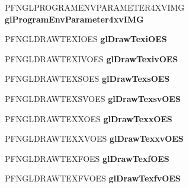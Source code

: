 \begin{DoxyCompactItemize}
\item 
\hypertarget{class_c_p_v_r_tgles_ext_a3f9936ef32dfaaa0a5e57d49b0a6a4ad}{P\+F\+N\+G\+L\+P\+R\+O\+G\+R\+A\+M\+E\+N\+V\+P\+A\+R\+A\+M\+E\+T\+E\+R4\+X\+V\+I\+M\+G {\bfseries gl\+Program\+Env\+Parameter4xv\+I\+M\+G}}\label{class_c_p_v_r_tgles_ext_a3f9936ef32dfaaa0a5e57d49b0a6a4ad}

\item 
\hypertarget{class_c_p_v_r_tgles_ext_a4cc9496b14a39f2ddc37dc9ef2ee9950}{P\+F\+N\+G\+L\+D\+R\+A\+W\+T\+E\+X\+I\+O\+E\+S {\bfseries gl\+Draw\+Texi\+O\+E\+S}}\label{class_c_p_v_r_tgles_ext_a4cc9496b14a39f2ddc37dc9ef2ee9950}

\item 
\hypertarget{class_c_p_v_r_tgles_ext_a1931e2f67771523267d8b02672d5a1fd}{P\+F\+N\+G\+L\+D\+R\+A\+W\+T\+E\+X\+I\+V\+O\+E\+S {\bfseries gl\+Draw\+Texiv\+O\+E\+S}}\label{class_c_p_v_r_tgles_ext_a1931e2f67771523267d8b02672d5a1fd}

\item 
\hypertarget{class_c_p_v_r_tgles_ext_ab3ec669c772512c975058543f5c95962}{P\+F\+N\+G\+L\+D\+R\+A\+W\+T\+E\+X\+S\+O\+E\+S {\bfseries gl\+Draw\+Texs\+O\+E\+S}}\label{class_c_p_v_r_tgles_ext_ab3ec669c772512c975058543f5c95962}

\item 
\hypertarget{class_c_p_v_r_tgles_ext_a024fc95335ec5854e8a09c81636b9ac1}{P\+F\+N\+G\+L\+D\+R\+A\+W\+T\+E\+X\+S\+V\+O\+E\+S {\bfseries gl\+Draw\+Texsv\+O\+E\+S}}\label{class_c_p_v_r_tgles_ext_a024fc95335ec5854e8a09c81636b9ac1}

\item 
\hypertarget{class_c_p_v_r_tgles_ext_aaf42aacaa35b157bed67e206942e1877}{P\+F\+N\+G\+L\+D\+R\+A\+W\+T\+E\+X\+X\+O\+E\+S {\bfseries gl\+Draw\+Texx\+O\+E\+S}}\label{class_c_p_v_r_tgles_ext_aaf42aacaa35b157bed67e206942e1877}

\item 
\hypertarget{class_c_p_v_r_tgles_ext_a8e958a6c6f29ebf43e43e2a58865a0ba}{P\+F\+N\+G\+L\+D\+R\+A\+W\+T\+E\+X\+X\+V\+O\+E\+S {\bfseries gl\+Draw\+Texxv\+O\+E\+S}}\label{class_c_p_v_r_tgles_ext_a8e958a6c6f29ebf43e43e2a58865a0ba}

\item 
\hypertarget{class_c_p_v_r_tgles_ext_aacac73832332b04957dbc093aece0a29}{P\+F\+N\+G\+L\+D\+R\+A\+W\+T\+E\+X\+F\+O\+E\+S {\bfseries gl\+Draw\+Texf\+O\+E\+S}}\label{class_c_p_v_r_tgles_ext_aacac73832332b04957dbc093aece0a29}

\item 
\hypertarget{class_c_p_v_r_tgles_ext_a588c31c1f68d21c26c942732c2627699}{P\+F\+N\+G\+L\+D\+R\+A\+W\+T\+E\+X\+F\+V\+O\+E\+S {\bfseries gl\+Draw\+Texfv\+O\+E\+S}}\label{class_c_p_v_r_tgles_ext_a588c31c1f68d21c26c942732c2627699}


\end{DoxyCompactItemize}
